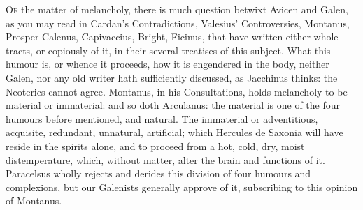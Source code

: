 {{\lettrine{O}{f} the matter of melancholy, there is much question betwixt Avicen and
Galen, as you may read in Cardan's Contradictions,
Valesius' Controversies, Montanus, Prosper Calenus, Capivaccius,
Bright, Ficinus, that have written either whole tracts, or
copiously of it, in their several treatises of this subject. What
this humour is, or whence it proceeds, how it is engendered in the
body, neither Galen, nor any old writer hath sufficiently discussed, as
Jacchinus thinks: the Neoterics cannot agree. Montanus, in his
Consultations, holds melancholy to be material or immaterial: and so
doth Arculanus: the material is one of the four humours before
mentioned, and natural. The immaterial or adventitious, acquisite,
redundant, unnatural, artificial; which  Hercules de Saxonia will
have reside in the spirits alone, and to proceed from a hot, cold, dry,
moist distemperature, which, without matter, alter the brain and
functions of it. Paracelsus wholly rejects and derides this division of
four humours and complexions, but our Galenists generally approve of
it, subscribing to this opinion of Montanus.

}}
